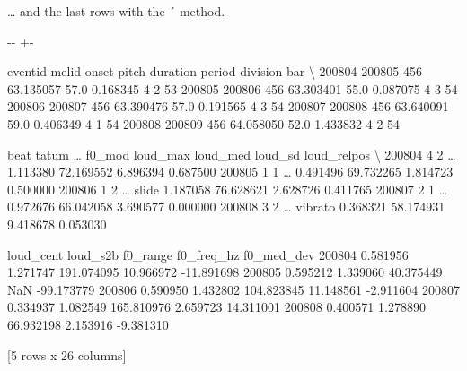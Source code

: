 \documentclass[letterpaper,10pt,english]{sphinxmanual}
\newlength\nbsphinxcodecellspacing
\begin{document}
… and the last rows with the ´ method.

{
\begin{sphinxVerbatim}[commandchars=\\\{\}]
\llap{\color{nbsphinxin}[10]:\,\hspace{\fboxrule}\hspace{\fboxsep}}
\end{sphinxVerbatim}
}

{

\kern-\sphinxverbatimsmallskipamount\kern-\baselineskip
\kern+\FrameHeightAdjust\kern-\fboxrule
\vspace{\nbsphinxcodecellspacing}

\begin{sphinxVerbatim}[commandchars=\\\{\}]
\llap{\color{nbsphinxout}[10]:\,\hspace{\fboxrule}\hspace{\fboxsep}}        eventid  melid      onset  pitch  duration  period  division  bar  \textbackslash{}
200804   200805    456  63.135057   57.0  0.168345       4         2   53
200805   200806    456  63.303401   55.0  0.087075       4         3   54
200806   200807    456  63.390476   57.0  0.191565       4         3   54
200807   200808    456  63.640091   59.0  0.406349       4         1   54
200808   200809    456  64.058050   52.0  1.433832       4         2   54

        beat  tatum  {\ldots}   f0\_mod  loud\_max   loud\_med   loud\_sd  loud\_relpos  \textbackslash{}
200804     4      2  {\ldots}           1.113380  72.169552  6.896394     0.687500
200805     1      1  {\ldots}           0.491496  69.732265  1.814723     0.500000
200806     1      2  {\ldots}    slide  1.187058  76.628621  2.628726     0.411765
200807     2      1  {\ldots}           0.972676  66.042058  3.690577     0.000000
200808     3      2  {\ldots}  vibrato  0.368321  58.174931  9.418678     0.053030

       loud\_cent  loud\_s2b    f0\_range  f0\_freq\_hz  f0\_med\_dev
200804  0.581956  1.271747  191.074095   10.966972  -11.891698
200805  0.595212  1.339060   40.375449         NaN  -99.173779
200806  0.590950  1.432802  104.823845   11.148561   -2.911604
200807  0.334937  1.082549  165.810976    2.659723   14.311001
200808  0.400571  1.278890   66.932198    2.153916   -9.381310

[5 rows x 26 columns]
\end{sphinxVerbatim}
}
\end{document}
